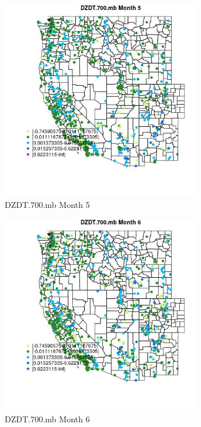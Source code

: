 \begin{figure} 
\centering  
\includegraphics[width=0.77\textwidth]{Code_Outputs/Report_ML_input_PM25_Step4_part_f_de_duplicated_aveswNAs_MapObsMo5DZDT700mb.jpg} 
\caption{\label{fig:Report_ML_input_PM25_Step4_part_f_de_duplicated_aveswNAsMapObsMo5DZDT700mb}DZDT.700.mb Month 5} 
\end{figure} 
 

\clearpage 

\begin{figure} 
\centering  
\includegraphics[width=0.77\textwidth]{Code_Outputs/Report_ML_input_PM25_Step4_part_f_de_duplicated_aveswNAs_MapObsMo6DZDT700mb.jpg} 
\caption{\label{fig:Report_ML_input_PM25_Step4_part_f_de_duplicated_aveswNAsMapObsMo6DZDT700mb}DZDT.700.mb Month 6} 
\end{figure} 
 


